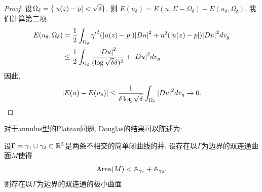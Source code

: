 \begin{proof}
    设$\Omega_\delta=\{{\left | u(z)-p \right |} < \sqrt{\delta}\}$. 则 $E(u_\delta)=E(u,\Sigma-\Omega_\delta)+E(u_\delta, \Omega_\delta)$. 我们计算第二项.
    \begin{equation}
        \begin{split}
            E(u_\delta, \Omega_\delta) & ={{\frac{1}{2}}}\int_{\Omega_\delta} {\eta'}^2({\left | u(z)-p \right |}){\left | Du \right |}^2+\eta^2({\left | u(z)-p \right |}) {\left | Du \right |}^2 dv_g\\
            &\le {{\frac{1}{2}}}\int_{\Omega_\delta} \frac{{\left | Du \right |}^2}{(\log\sqrt{\delta}\delta)^2} +{\left | Du \right |}^2dv_g
        \end{split}
    \end{equation}
    因此, 
    \begin{equation}
        {\left | E(u)-E(u_\delta) \right |} \le \frac{1}{\delta\log\sqrt{\delta}}\int_{\Omega_\delta} {\left | Du \right |}^2dv_g \to 0.
    \end{equation}
\end{proof}
对于annulus型的Plateau问题, Douglas的结果可以陈述为:
\begin{theorem}
    设$\Gamma= \gamma_1 \cup \gamma_2 \subset {\mathbb{R}}^3$是两条不相交的简单闭曲线的并. 设存在以$\Gamma$为边界的双连通曲面$M$使得
    \begin{equation} \label{douglas_condition_annulus}
        \text{Area}(M) < {\mathbb{A}}_{\gamma_1}+{\mathbb{A}}_{\gamma_2}.
    \end{equation}
    则存在以$\Gamma$为边界的双连通的极小曲面.
\end{theorem}
